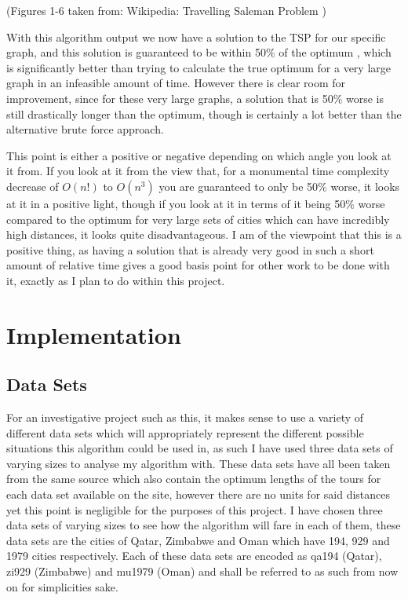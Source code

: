 \documentclass[11pt,a4paper,titlepage]{article}
\begin{document}
(Figures 1-6 taken from: Wikipedia: Travelling Saleman Problem \cite{TSPWiki})

With this algorithm output we now have a solution to the TSP for our specific graph, and this solution is guaranteed to be within 50\% of the optimum \cite{ChrAlg}, which is significantly better than trying to calculate the true optimum for a very large graph in an infeasible amount of time. However there is clear room for improvement, since for these very large graphs, a solution that is 50\% worse is still drastically longer than the optimum, though is certainly a lot better than the alternative brute force approach. 

This point is either a positive or negative depending on which angle you look at it from. If you look at it from the view that, for a monumental time complexity decrease of $O(n!)$ to $O(n^3)$ you are guaranteed to only be 50\% worse, it looks at it in a positive light, though if you look at it in terms of it being 50\% worse compared to the optimum for very large sets of cities which can have incredibly high distances, it looks quite disadvantageous. I am of the viewpoint that this is a positive thing, as having a solution that is already very good in such a short amount of relative time gives a good basis point for other work to be done with it, exactly as I plan to do within this project.

\section{Implementation}

\subsection{Data Sets}

For an investigative project such as this, it makes sense to use a variety of different data sets which will appropriately represent the different possible situations this algorithm could be used in, as such I have used three data sets of varying sizes to analyse my algorithm with. These data sets have all been taken from the same source \cite{TSPRep1} which also contain the optimum lengths of the tours for each data set available on the site, however there are no units for said distances yet this point is negligible for the purposes of this project. I have chosen three data sets of varying sizes to see how the algorithm will fare in each of them, these data sets are the cities of Qatar, Zimbabwe and Oman which have 194, 929 and 1979 cities respectively. Each of these data sets are encoded as qa194 (Qatar), zi929 (Zimbabwe) and mu1979 (Oman) and shall be referred to as such from now on for simplicities sake.
\pagebreak
\end{document}
